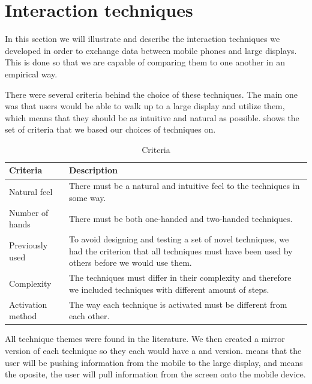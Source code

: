 \section{Interaction techniques} \label{sec:techniques}
In this section we will illustrate and describe the interaction techniques we developed in order to exchange data between mobile phones and large displays.
This is done so that we are capable of comparing them to one another in an empirical way.

There were several criteria behind the choice of these techniques. 
The main one was that users would be able to walk up to a large display and utilize them, which means that they should be as intuitive and natural as possible. 
 shows the set of criteria that we based our choices of techniques on.

\begin{table}[H]
	\centering
	\begin{tabular}{|p{}|p{}|}
		\hline
		\rowcolor[HTML]{9B9B9B} 
		\textbf{Criteria} & \textbf{Description} \\ \hline
		Natural feel & There must be a natural and intuitive feel to the techniques in some way. \\ \hline
		Number of hands & There must be both one-handed and two-handed techniques. \\ \hline
		Previously used & To avoid designing and testing a set of novel techniques, we had the criterion that all techniques must have been used by others before we would use them. \\ \hline
		Complexity & The techniques must differ in their complexity and therefore we included techniques with different amount of steps. \\ \hline
		Activation method & The way each technique is activated must be different from each other. \\ \hline
	\end{tabular}
	\caption{Criteria}
	\label{tab:techniqueCriteria}
\end{table}


All technique themes were found in the literature.
We then created a mirror version of each technique so they each would have a \push and \pull version.
\push means that the user will be pushing information from the mobile to the large display, and \pull means the oposite, the user will pull information from the screen onto the mobile device. 

